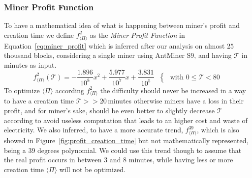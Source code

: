 \documentclass[USenglish]{uit-thesis}
\begin{document}
\subsubsection{Miner Profit Function}
\label{sec:minerprofitfunction}
To have a mathematical idea of what is happening
between miner's profit and creation time
we define $f^{2}_{\langle \Pi \rangle}$ as the
\emph{Miner Profit Function} in Equation~\ref{eq:miner_profit}
which is inferred after our analysis on almost
$25$\,thousand blocks, considering a single
miner using AntMiner S$9$, and having $\mathcal{T}$
in minutes as input.
\begin{equation}
\label{eq:miner_profit}
f^{2}_{\langle \Pi \rangle}(\mathcal{T}) = - \frac{1.896}{10^8} x^2 + \frac{5.977}{10^7} x + \frac{3.831}{10^5} \mbox{ }\begin{cases} \mbox{ with } 0 \leq \mathcal{T} < 80 \end{cases}
\end{equation}
To optimize $\langle \Pi \rangle$ according
$f^{2}_{\langle \Pi \rangle}$ the
difficulty should never be increased in a way to
have a creation time $\mathcal{T} >> 20$\,minutes otherwise
miners have a loss in their profit,
and for miner's sake, should be even better to slightly
decrease $\mathcal{T}$ according to avoid
useless computation that leads to an higher cost and waste
of electricity.
We also inferred, to have a more accurate trend, $f_{\langle \Pi \rangle}^{39}$,
which is also showed in Figure~\ref{fig:profit_creation_time} but
not mathematically represented, being a $39$ degrees polynomial.
We could use this trend though to assume that the real
profit occurs in between $3$ and $8$ minutes,
while having less or more creation time
$\langle \Pi \rangle$ will not be optimized.
\end{document}
